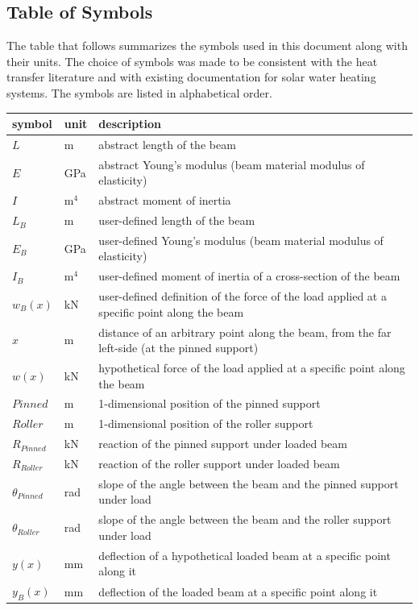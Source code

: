 \documentclass[12pt]{article}
\begin{document}
\subsection{Table of Symbols}

The table that follows summarizes the symbols used in this document along with
their units.  The choice of symbols was made to be consistent with the heat
transfer literature and with existing documentation for solar water heating
systems.  The symbols are listed in alphabetical order.

\renewcommand{\arraystretch}{1.2}
\noindent
\begin{longtable*}{l l p{12cm}}
    \toprule
    \textbf{symbol} & \textbf{unit} & \textbf{description}\\
    \midrule
    \(L\) & \si{\metre} & abstract length of the beam \\
    \(E\) & \si{\giga\pascal} & abstract Young's modulus (beam material modulus of elasticity) \\
    \(I\) & \(\si{\metre{}}^{4}\) & abstract moment of inertia \\
    \(L_{B}\) & \si{\metre} & user-defined length of the beam \\
    \(E_{B}\) & \si{\giga\pascal} & user-defined Young's modulus (beam material modulus of elasticity) \\
    \(I_{B}\) & \(\si{\metre{}}^{4}\) & user-defined moment of inertia of a cross-section of the beam \\
    \(w_B(x)\) & \si{\kilo\newton} & user-defined definition of the force of the load applied at a specific point along the beam \\
    \(x\) & \si{\metre} & distance of an arbitrary point along the beam, from the far left-side (at the pinned support) \\
    \(w(x)\) & \si{\kilo\newton} & hypothetical force of the load applied at a specific point along the beam \\
    \(\mathit{Pinned}\) & \si{\metre} & 1-dimensional position of the pinned support \\
    \(\mathit{Roller}\) & \si{\metre} & 1-dimensional position of the roller support \\
    \(R_{\mathit{Pinned}}\) & \si{\kilo\newton} & reaction of the pinned support under loaded beam \\
    \(R_{\mathit{Roller}}\) & \si{\kilo\newton} & reaction of the roller support under loaded beam \\
    \(\theta{}_{\mathit{Pinned}}\) & \si{\radian} & slope of the angle between the beam and the pinned support under load \\
    \(\theta{}_{\mathit{Roller}}\) & \si{\radian} & slope of the angle between the beam and the roller support under load \\
    \(y(x)\) & \si{\milli\metre} & deflection of a hypothetical loaded beam at a specific point along it \\
    \(y_{B}(x)\) & \si{\milli\metre} & deflection of the loaded beam at a specific point along it \\
    \bottomrule
\end{longtable*}
\end{document}
